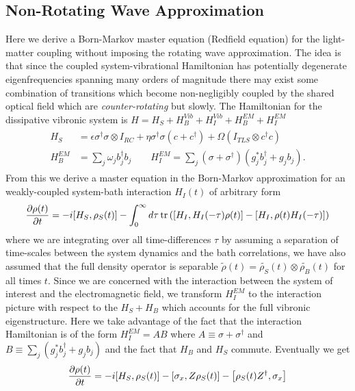 \documentclass[]{article}
\begin{document}
\subsection{Non-Rotating Wave Approximation}
\label{ssec:nrwa}
Here we derive a Born-Markov master equation (Redfield equation) for the light-matter coupling without imposing the rotating wave approximation. The idea is that since the coupled system-vibrational Hamiltonian has potentially degenerate eigenfrequencies spanning many orders of magnitude there may exist some combination of transitions which become non-negligibly coupled by the shared optical field which are \textit{counter-rotating} but slowly. The Hamiltonian for the dissipative vibronic system is $H = H_S + H_B^{Vib} + H_I^{Vib} + H_B^{EM} + H_I^{EM}$
\begin{align}
\label{eq:H_nrwa}
	\begin{split}
		H_S &= \epsilon \sigma^{\dagger}\sigma\otimes I_{RC} + \eta\sigma^{\dagger}\sigma(c + c^{\dagger}) + \Omega ( I_{TLS}\otimes c^{\dagger}c) \\
		H_B^{EM} &= \sum_{j}\omega_j b^{\dagger}_j b_j \quad \quad H_I^{EM} = \sum_{j}(\sigma+\sigma^{\dagger})(g_j^*b^{\dagger}_j+ g_j b_j).
	\end{split}
\end{align}
From this we derive a master equation in the Born-Markov approximation for an weakly-coupled system-bath interaction $H_I(t)$ of arbitrary form
\begin{equation}
\pdv{\rho(t)}{t} = -i[H_S, \rho_S(t)] -\int_{0}^{\infty}d\tau\tr\left(\left[H_I, H_I(-\tau)\rho(t)\right] - \left[H_I, \rho(t)H_I(-\tau)\right]\right)
\end{equation}
where we are integrating over all time-differences $\tau$ by assuming a separation of time-scales between the system dynamics and the bath correlations, we have also assumed that the full density operator is separable $\tilde{\rho}(t) = \tilde{\rho_S}(t)\otimes\tilde{\rho_B}(t)$ for all times $t$. Since we are concerned with the interaction between the system of interest and the electromagnetic field, we transform $H_I^{EM}$ to the interaction picture with respect to the $H_S + H_B$ which accounts for the full vibronic eigenstructure. Here we take advantage of the fact that the interaction Hamiltonian is of the form $H_I^{EM}=AB$ where $A \equiv \sigma + \sigma^{\dagger}$ and $B\equiv \sum_{j}(g_j^*b^{\dagger}_j+ g_j b_j)$ and the fact that $H_B$ and $H_S$ commute.
Eventually we get
\begin{equation}
\label{nRWA_master}
\pdv{\rho(t)}{t} = -i[H_S, \rho_S(t)] - \left[\sigma_x, Z\rho_S(t)\right] - \left[\rho_S(t) Z^{\dagger}, \sigma_x\right]
\end{equation}
\end{document}
